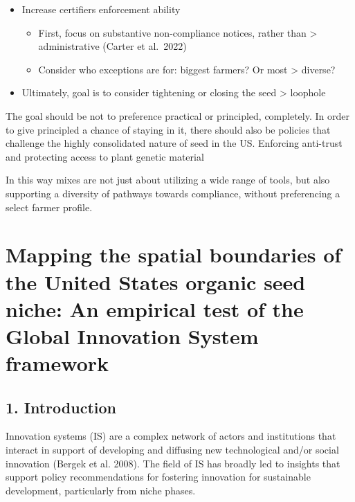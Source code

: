 \documentclass[twoside,12pt,final]{ucthesis-CA2012}
\begin{document}
\begin{ucmainmatter}
\begin{itemize}
\begin{itemize}
  \end{itemize}
\item
  Increase certifiers enforcement ability
  \begin{itemize}
  \item
    First, focus on substantive non-compliance notices, rather than
    \textgreater{} administrative (Carter et al.~2022)
  \item
    Consider who exceptions are for: biggest farmers? Or most
    \textgreater{} diverse?
  \end{itemize}
\item
  Ultimately, goal is to consider tightening or closing the seed
  \textgreater{} loophole
\end{itemize}
The goal should be not to preference practical or principled,
completely. In order to give principled a chance of staying in it, there
should also be policies that challenge the highly consolidated nature of
seed in the US. Enforcing anti-trust and protecting access to plant
genetic material

In this way mixes are not just about utilizing a wide range of tools,
but also supporting a diversity of pathways towards compliance, without
preferencing a select farmer profile.

\hypertarget{mapping-the-spatial-boundaries-of-the-united-states-organic-seed-niche-an-empirical-test-of-the-global-innovation-system-framework}{%
\chapter{Mapping the spatial boundaries of the United State\textquotesingle s organic seed niche: An empirical test of the Global Innovation System framework}\label{mapping-the-spatial-boundaries-of-the-united-states-organic-seed-niche-an-empirical-test-of-the-global-innovation-system-framework}}


\hypertarget{introduction-2}{%
\section{1. Introduction}\label{introduction-2}}

Innovation systems (IS) are a complex network of actors and institutions
that interact in support of developing and diffusing new technological
and/or social innovation (Bergek et al.
2008). The field of IS has
broadly led to insights that support policy recommendations for
fostering innovation for sustainable development, particularly from
\textquotesingle niche\textquotesingle{} phases.


\end{ucmainmatter}
\end{document}
